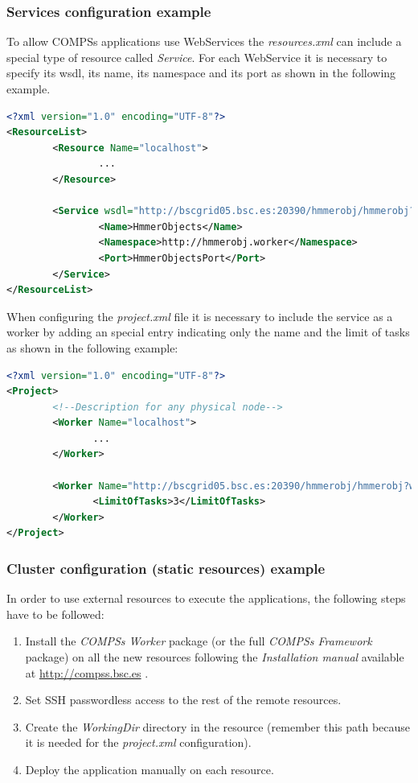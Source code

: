 \subsubsection{Services configuration example}
To allow COMPSs applications use WebServices the \textit{resources.xml} can include a special type of resource called 
\textit{Service}. For each WebService it is necessary to specify its wsdl, its name, its namespace and
its port as shown in the following example. 
\begin{lstlisting}[language=xml]
<?xml version="1.0" encoding="UTF-8"?>
<ResourceList>
        <Resource Name="localhost">
                ...
        </Resource>
                
        <Service wsdl="http://bscgrid05.bsc.es:20390/hmmerobj/hmmerobj?wsdl">
                <Name>HmmerObjects</Name>
                <Namespace>http://hmmerobj.worker</Namespace>
                <Port>HmmerObjectsPort</Port>
        </Service>
</ResourceList>
\end{lstlisting}

When configuring the \textit{project.xml} file it is necessary to include the service as a worker by adding an
special entry indicating only the name and the limit of tasks as shown in the following example:
\begin{lstlisting}[language=xml]
<?xml version="1.0" encoding="UTF-8"?>
<Project>
        <!--Description for any physical node-->
        <Worker Name="localhost">
               ...
        </Worker>

        <Worker Name="http://bscgrid05.bsc.es:20390/hmmerobj/hmmerobj?wsdl">
               <LimitOfTasks>3</LimitOfTasks>
        </Worker>
</Project>
\end{lstlisting}

\subsubsection{Cluster configuration (static resources) example}
In order to use external resources to execute the applications, the following steps have to be followed:

\begin{enumerate}
 \item Install the \textit{COMPSs Worker} package (or the full \textit{COMPSs Framework} package) on all the new 
 resources following the \textit{Installation manual} available at \url{http://compss.bsc.es} .
 \item Set SSH passwordless access to the rest of the remote resources.
 \item Create the \textit{WorkingDir} directory in the resource (remember this path because it is needed 
 for the \textit{project.xml} configuration).
 \item Deploy the application manually on each resource.
\end{enumerate}

